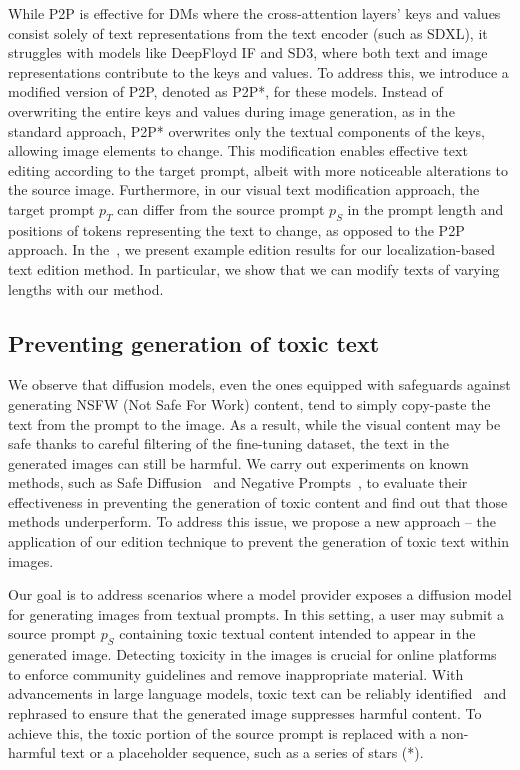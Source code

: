 While P2P is effective for DMs where the cross-attention layers’ keys and values consist solely of text representations from the text encoder (such as SDXL), it struggles with models like DeepFloyd IF and SD3, where both text and image representations contribute to the keys and values. To address this, we introduce a modified version of P2P, denoted as P2P*, for these models. Instead of overwriting the entire keys and values during image generation, as in the standard approach, P2P* overwrites only the textual components of the keys, allowing image elements to change. This modification enables effective text editing according to the target prompt, albeit with more noticeable alterations to the source image.
Furthermore, in our visual text modification approach, the target prompt $p_T$ can differ from the source prompt $p_S$ in the prompt length and positions of tokens representing the text to change, as opposed to the P2P approach. In the~, we present example edition results for our localization-based text edition method. In particular, we show that we can modify texts of varying lengths with our method.

\subsection{Preventing generation of toxic text}
\label{sec:preventing}
We observe that diffusion models, even the ones equipped with safeguards against generating NSFW (Not Safe For Work) content, tend to simply copy-paste the text from the prompt to the image. As a result, while the visual content may be safe thanks to careful filtering of the fine-tuning dataset, the text in the generated images can still be harmful. We carry out experiments on known methods, such as Safe Diffusion~\citep{schramowski2023safe} and Negative Prompts~\citep{negative-promtps}, to evaluate their effectiveness in preventing the generation of toxic content and find out that those methods underperform. To address this issue, we propose a new approach -- the application of our edition technique to prevent the generation of toxic text within images.

Our goal is to address scenarios where a model provider exposes a diffusion model for generating images from textual prompts. In this setting, a user may submit a source prompt $p_S$ containing toxic textual content intended to appear in the generated image. Detecting toxicity in the images is crucial for online platforms to enforce community guidelines and remove inappropriate material. With advancements in large language models, toxic text can be reliably identified~\citep{zhang2024efficient} and rephrased to ensure that the generated image suppresses harmful content. To achieve this, the toxic portion of the source prompt is replaced with a non-harmful text or a placeholder sequence, such as a series of stars (*).

